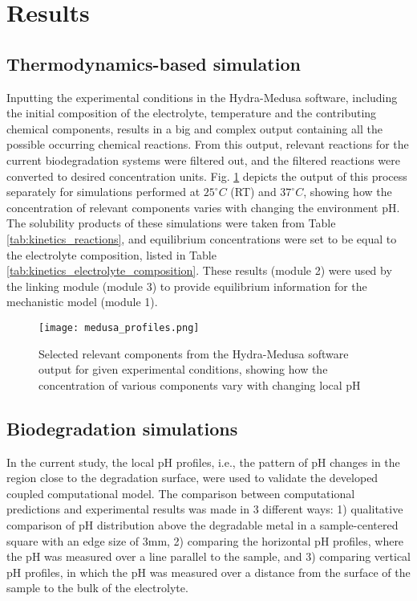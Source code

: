 \section{Results}

\subsection{Thermodynamics-based simulation}

Inputting the experimental conditions in the Hydra-Medusa software, including the initial composition of the electrolyte, temperature and the contributing chemical components, results in a big and complex output containing all the possible occurring chemical reactions. From this output, relevant reactions for the current biodegradation systems were filtered out, and the filtered reactions were converted to desired concentration units. Fig. \ref{fig:kinetics_medusa_profiles} depicts the output of this process separately for simulations performed at $25^{\circ}C$ (\gls{RT}) and $37^{\circ}C$, showing how the concentration of relevant components varies with changing the environment pH. The solubility products of these simulations were taken from Table \ref{tab:kinetics_reactions}, and equilibrium concentrations were set to be equal to the electrolyte composition, listed in Table  \ref{tab:kinetics_electrolyte_composition}. These results (module 2) were used by the linking module (module 3) to provide equilibrium information for the mechanistic model (module 1).

\begin{figure}[h]
\centering
\medskip
\texttt{[image: medusa\_profiles.png]}
\caption[Hydra-Medusa software output for given experimental conditions]{Selected relevant components from the Hydra-Medusa software output for given experimental conditions, showing how the concentration of various components vary with changing local pH} \label{fig:kinetics_medusa_profiles}
\end{figure}

\subsection{Biodegradation simulations}

In the current study, the local pH profiles, i.e., the pattern of pH changes in the region close to the degradation surface, were used to validate the developed coupled computational model. The comparison between computational predictions and experimental results was made in 3 different ways: 1) qualitative comparison of pH distribution above the degradable metal in a sample-centered square with an edge size of $3 \text{mm}$, 2) comparing the horizontal pH profiles, where the pH was measured over a line parallel to the sample, and 3) comparing vertical pH profiles, in which the pH was measured over a distance from the surface of the sample to the bulk of the electrolyte.

